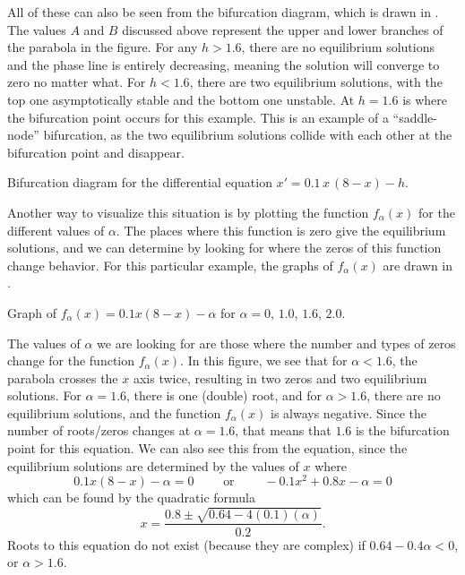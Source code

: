 \begin{exampleSol}
All of these can also be seen from the bifurcation diagram, which is drawn in . The values $A$ and $B$ discussed above represent the upper and lower branches of the parabola in the figure. For any $h > 1.6$, there are no equilibrium solutions and the phase line is entirely decreasing, meaning the solution will converge to zero no matter what. For $h < 1.6$, there are two equilibrium solutions, with the top one asymptotically stable and the bottom one unstable. At $h=1.6$ is where the bifurcation point occurs for this example. This is an example of a ``saddle-node'' bifurcation, as the two equilibrium solutions collide with each other at the bifurcation point and disappear.  

\begin{myfig}
\capstart
{}
\caption{Bifurcation diagram for the differential equation
$x' = 0.1\,x\,(8-x)-h$.\label{BifDiag_ex2:fig}}
\end{myfig}

Another way to visualize this situation is by plotting the function $f_\alpha(x)$ for the different values of $\alpha$. The places where this function is zero give the equilibrium solutions, and we can determine \emph{} by looking for where the zeros of this function change behavior. For this particular example, the graphs of $f_\alpha(x)$ are drawn in . 

\begin{myfig}
\capstart
{}
\caption{Graph of $f_\alpha(x) = 0.1x(8-x) - \alpha$ for $\alpha = 0$, $1.0$, $1.6$, $2.0$.\label{BifDiag_ex2FGraph:fig}}
\end{myfig}
\end{exampleSol}

The values of $\alpha$ we are looking for are those where the number and types of zeros change for the function $f_\alpha(x)$. In this figure, we see that for $\alpha < 1.6$, the parabola crosses the $x$ axis twice, resulting in two zeros and two equilibrium solutions. For $\alpha = 1.6$, there is one (double) root, and for $\alpha > 1.6$, there are no equilibrium solutions, and the function $f_\alpha(x)$ is always negative. Since the number of roots/zeros changes at $\alpha = 1.6$, that means that $1.6$ is the bifurcation point for this equation. We can also see this from the equation, since the equilibrium solutions are determined by the values of $x$ where
\begin{equation*}
0.1x(8-x) - \alpha = 0 \qquad \text{ or } \qquad -0.1x^2 + 0.8x - \alpha = 0 
\end{equation*}
which can be found by the quadratic formula
\begin{equation*}
x = \frac{0.8 \pm \sqrt{0.64 - 4(0.1)(\alpha)}}{0.2}.
\end{equation*}
Roots to this equation do not exist (because they are complex) if $0.64 - 0.4\alpha < 0$, or $\alpha > 1.6$. 

